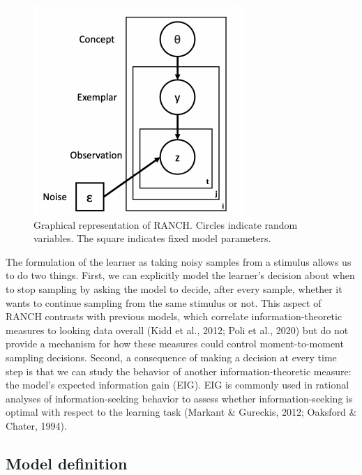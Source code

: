 \documentclass[10pt, letterpaper]{article}
\newenvironment{CodeChunk}{}{}
\begin{document}
\begin{CodeChunk}
\begin{figure}[H]

{\centering \includegraphics{figs/plate_diagram-1} 

}

\caption[Graphical representation of RANCH]{Graphical representation of RANCH. Circles indicate random variables. The square indicates fixed model parameters.}\label{fig:plate_diagram}
\end{figure}
\end{CodeChunk}

The formulation of the learner as taking noisy samples from a stimulus
allows us to do two things. First, we can explicitly model the learner's
decision about when to stop sampling by asking the model to decide,
after every sample, whether it wants to continue sampling from the same
stimulus or not. This aspect of RANCH contrasts with previous models,
which correlate information-theoretic measures to looking data overall
(Kidd et al., 2012; Poli et al., 2020) but do not provide a mechanism
for how these measures could control moment-to-moment sampling
decisions. Second, a consequence of making a decision at every time step
is that we can study the behavior of another information-theoretic
measure: the model's expected information gain (EIG). EIG is commonly
used in rational analyses of information-seeking behavior to assess
whether information-seeking is optimal with respect to the learning task
(Markant \& Gureckis, 2012; Oaksford \& Chater, 1994).

\hypertarget{model-definition}{%
\subsection{Model definition}\label{model-definition}}
\end{document}
